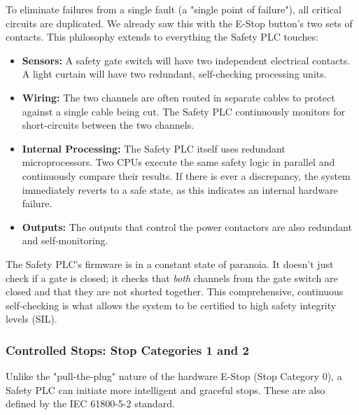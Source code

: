 To eliminate failures from a single fault (a "single point of failure"), all critical circuits are duplicated. We already saw this with the E-Stop button's two sets of contacts. This philosophy extends to everything the Safety PLC touches:
\begin{itemize}
    \item \textbf{Sensors:} A safety gate switch will have two independent electrical contacts. A light curtain will have two redundant, self-checking processing units.
    \item \textbf{Wiring:} The two channels are often routed in separate cables to protect against a single cable being cut. The Safety PLC continuously monitors for short-circuits between the two channels.
    \item \textbf{Internal Processing:} The Safety PLC itself uses redundant microprocessors. Two CPUs execute the same safety logic in parallel and continuously compare their results. If there is ever a discrepancy, the system immediately reverts to a safe state, as this indicates an internal hardware failure.
    \item \textbf{Outputs:} The outputs that control the power contactors are also redundant and self-monitoring.
\end{itemize}

The Safety PLC's firmware is in a constant state of paranoia. It doesn't just check if a gate is closed; it checks that \textit{both} channels from the gate switch are closed and that they are not shorted together. This comprehensive, continuous self-checking is what allows the system to be certified to high safety integrity levels (SIL).

\subsubsection{Controlled Stops: Stop Categories 1 and 2}
\label{subsubsec:stop_categories_1_2}

Unlike the "pull-the-plug" nature of the hardware E-Stop (Stop Category 0), a Safety PLC can initiate more intelligent and graceful stops. These are also defined by the IEC 61800-5-2 standard.

